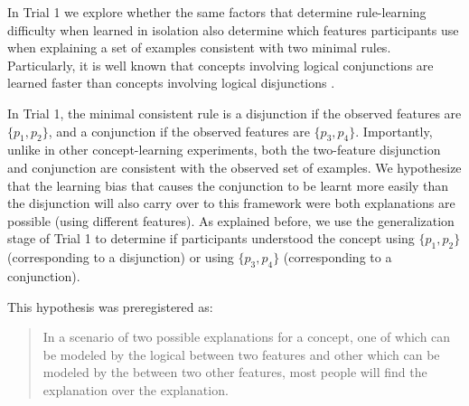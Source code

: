 \begin{hyp}\label{Hip:AndOverOr} 
In Trial 1 we explore whether the same factors that determine rule-learning difficulty when learned in isolation also determine which features participants use when explaining a set of examples consistent with two minimal rules. Particularly, it is well known that concepts involving logical conjunctions are learned faster than concepts involving logical disjunctions \cite{bourne1970knowing}.

In Trial 1, the minimal consistent rule is a disjunction if the observed features are $\{p_1, p_2\}$, and a conjunction if the observed features are $\{p_3, p_4\}$. Importantly, unlike in other concept-learning experiments, both the two-feature disjunction and conjunction are consistent with the observed set of examples. We hypothesize that the learning bias that causes the conjunction to be learnt more easily than the disjunction will also carry over to this framework were both explanations are possible (using different features). As explained before, we use the generalization stage of Trial 1 to determine if participants understood the concept using $\{p_1, p_2\}$ (corresponding to a disjunction) or using $\{p_3, p_4\}$ (corresponding to a conjunction).


This hypothesis was preregistered as:
\begin{quote}
In a scenario of two possible explanations for a concept, one of which can be modeled by the logical \AND between two features and other which can be modeled by the \OR between two other features, most people will find the \AND explanation over the \OR explanation.%
\end{quote}
\end{hyp}

